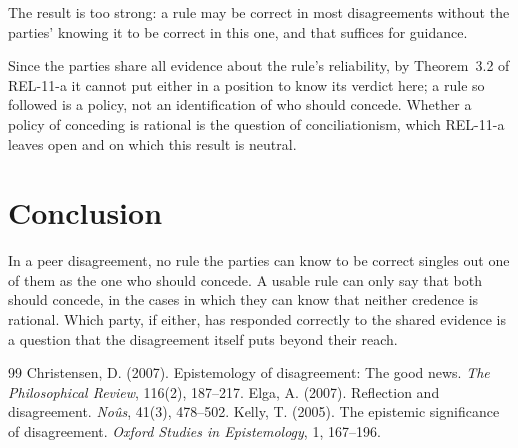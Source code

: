 \documentclass{situationist-preprint}
\begin{document}
\begin{objection}
The result is too strong: a rule may be correct in most disagreements without the parties' knowing it to be correct in this one, and that suffices for guidance.
\end{objection}

\begin{reply}
Since the parties share all evidence about the rule's reliability, by Theorem~3.2 of REL-11-a it cannot put either in a position to know its verdict here; a rule so followed is a policy, not an identification of who should concede. Whether a policy of conceding is rational is the question of conciliationism, which REL-11-a leaves open and on which this result is neutral.
\end{reply}

\section{Conclusion}

In a peer disagreement, no rule the parties can know to be correct singles out one of them as the one who should concede. A usable rule can only say that both should concede, in the cases in which they can know that neither credence is rational. Which party, if either, has responded correctly to the shared evidence is a question that the disagreement itself puts beyond their reach.

\begin{thebibliography}{99}\small
{} Christensen, D. (2007). Epistemology of disagreement: The good news. \emph{The Philosophical Review}, 116(2), 187--217.
 Elga, A. (2007). Reflection and disagreement. \emph{No\^us}, 41(3), 478--502.
 Kelly, T. (2005). The epistemic significance of disagreement. \emph{Oxford Studies in Epistemology}, 1, 167--196.
\end{thebibliography}
\end{document}
